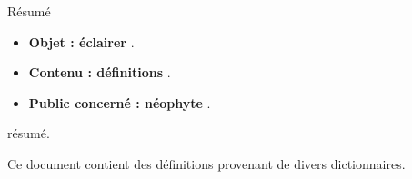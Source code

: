\begin{center}
\Large
Résumé
\normalsize
\end{center}
\vspace{3cm}
\begin{itemize}[leftmargin=1cm, label=, itemsep=21pt]
\item {\bf Objet : éclairer } .
\item {\bf Contenu : définitions} .
\item {\bf Public concerné : néophyte} .
\end{itemize}

\vspace{3cm}

résumé.

\vspace{3cm}

Ce document contient des définitions provenant de divers dictionnaires.


